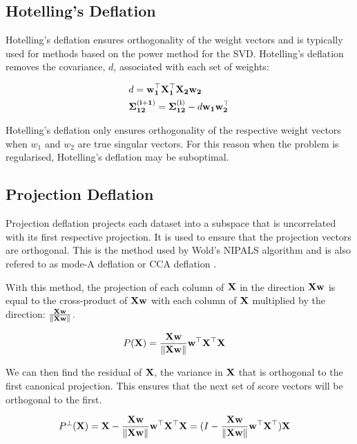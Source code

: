 \subsection{Hotelling's Deflation}
Hotelling's deflation ensures orthogonality of the weight vectors and is typically used for methods based on the power method for the SVD. Hotelling's deflation removes the covariance, $d$, associated with each set of weights:

\begin{align}
    & d = \bold{w^{\top}_1X^{\top}_1X_2w_2}\\
    & \bold{\Sigma^{(i+1)}_{12}}= \bold{\Sigma^{(i)}_{12}} - d\bold{w_1w^{\top}_2}
\end{align}

Hotelling's deflation only ensures orthogonality of the respective weight vectors when $w_1$ and $w_2$ are true singular vectors. For this reason when the problem is regularised, Hotelling's deflation may be suboptimal.

\subsection{Projection Deflation}

Projection deflation projects each dataset into a subspace that is uncorrelated with its first respective projection. It is used to ensure that the projection vectors are orthogonal. This is the method used by Wold's NIPALS algorithm and is also refered to as mode-A deflation or CCA deflation \cite{mackey2009deflation}.

With this method, the projection of each column of $\bold{X}$ in the direction $\bold{Xw}$ is equal to the cross-product of $\bold{Xw}$ with each column of $\bold{X}$ multiplied by the direction: $\frac{\bold{Xw}}{\|\bold{Xw}\|}$.

\begin{align}
    & P(\bold{X})= \frac{\bold{Xw}}{\|\bold{Xw}\|}\bold{w^{\top}X^{\top}X}
\end{align}

We can then find the residual of $\bold{X}$, the variance in $\bold{X}$  that is orthogonal to the first canonical projection. This ensures that the next set of score vectors will be orthogonal to the first.

\begin{align}
    & P^\perp(\bold{X})= \bold{X} - \frac{\bold{Xw}}{\|\bold{Xw}\|}\bold{w^{\top}X^{\top}X} = (I - \frac{\bold{Xw}}{\|\bold{Xw}\|}\bold{w^{\top}X^{\top})X}
\end{align}


